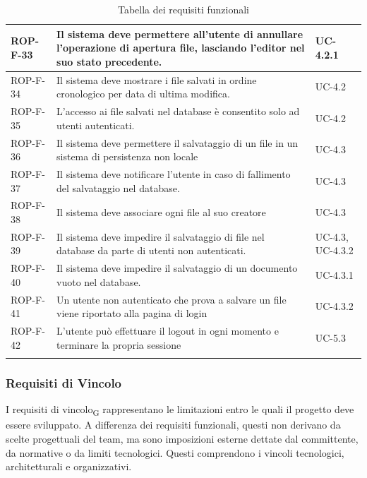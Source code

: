 \documentclass[11pt,a4paper]{article}
\begin{document}
\begin{longtable}{|p{}|>{\raggedright\arraybackslash}p{}|p{}|}
\hline
ROP-F-33 & Il sistema deve permettere all'utente di annullare l'operazione di apertura file, lasciando l'editor nel suo stato precedente. & UC-4.2.1 \\
\hline
ROP-F-34 & Il sistema deve mostrare i file salvati in ordine cronologico per data di ultima modifica. & UC-4.2 \\
\hline
ROP-F-35 & L'accesso ai file salvati nel database è consentito solo ad utenti autenticati. & UC-4.2 \\
\hline
ROP-F-36 & Il sistema deve permettere il salvataggio di un file in un sistema di persistenza non locale & UC-4.3 \\
\hline
ROP-F-37 & Il sistema deve notificare l'utente in caso di fallimento del salvataggio nel database. & UC-4.3 \\
\hline
ROP-F-38 & Il sistema deve associare ogni file al suo creatore & UC-4.3 \\
\hline
ROP-F-39 & Il sistema deve impedire il salvataggio di file nel database da parte di utenti non autenticati. & UC-4.3, UC-4.3.2 \\
\hline
ROP-F-40 & Il sistema deve impedire il salvataggio di un documento vuoto nel database. & UC-4.3.1 \\
\hline
ROP-F-41 & Un utente non autenticato che prova a salvare un file viene riportato alla pagina di login & UC-4.3.2 \\
\hline
ROP-F-42 & L'utente può effettuare il logout in ogni momento e terminare la propria sessione & UC-5.3 \\
\hline
\addlinespace[1em]
\caption{Tabella dei requisiti funzionali}
\end{longtable}

\newpage
\subsubsection{Requisiti di Vincolo}
I requisiti di vincolo\textsubscript{G} rappresentano le limitazioni entro le quali il progetto deve essere sviluppato. A differenza dei requisiti funzionali, questi non derivano da scelte progettuali del team, ma sono imposizioni esterne dettate dal committente, da normative o da limiti tecnologici. Questi comprendono i vincoli tecnologici, architetturali e organizzativi.
\end{document}

